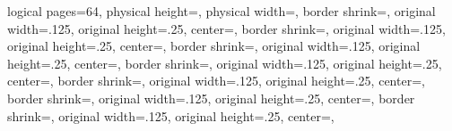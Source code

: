 %
%
%
%
%
{%
	\edef\pgfpageoptionheight{\the\paperheight}%
	\edef\pgfpageoptionwidth{\the\paperwidth}%
	\edef\pgfpageoptionborder{1pt}%
}%
{
  \pgfpagesphysicalpageoptions%
  {%
    logical pages=64,%
    physical height=\pgfpageoptionheight,%
    physical width=\pgfpageoptionwidth,%
  }%
%
%
  {%
    border shrink=\pgfpageoptionborder,%
    original width=.125\pgfpageoptionheight,%
    original height=.25\pgfpageoptionwidth,%
	center=\pgfpoint{0pt}{\pgfphysicalheight},%
  }%
  {%
    border shrink=\pgfpageoptionborder,%
    original width=.125\pgfpageoptionheight,%
    original height=.25\pgfpageoptionwidth,%
	center=\pgfpoint{.25\pgfphysicalwidth}{\pgfphysicalheight},%
  }%
  {%
    border shrink=\pgfpageoptionborder,%
    original width=.125\pgfpageoptionheight,%
    original height=.25\pgfpageoptionwidth,%
	center=\pgfpoint{.5\pgfphysicalwidth}{\pgfphysicalheight},%
  }%
  {%
    border shrink=\pgfpageoptionborder,%
    original width=.125\pgfpageoptionheight,%
    original height=.25\pgfpageoptionwidth,%
	center=\pgfpoint{.75\pgfphysicalwidth}{\pgfphysicalheight},%
  }%
  {%
  	border shrink=\pgfpageoptionborder,%
  	original width=.125\pgfpageoptionheight,%
  	original height=.25\pgfpageoptionwidth,%
	center=\pgfpoint{0pt}{.875\pgfphysicalheight},%
  }%
  {%
	border shrink=\pgfpageoptionborder,%
	original width=.125\pgfpageoptionheight,%
	original height=.25\pgfpageoptionwidth,%
	center=\pgfpoint{.25\pgfphysicalwidth}{.875\pgfphysicalheight},%
  }%
  {%
	border shrink=\pgfpageoptionborder,%
	original width=.125\pgfpageoptionheight,%
	original height=.25\pgfpageoptionwidth,%
	center=\pgfpoint{.5\pgfphysicalwidth}{.875\pgfphysicalheight},%
}}

